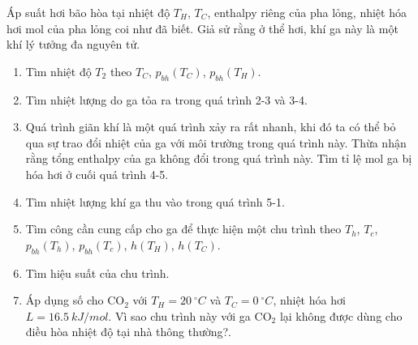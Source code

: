 Áp suất hơi bão hòa tại nhiệt độ \(T_H\), \(T_C\), enthalpy riêng của pha lỏng, nhiệt hóa hơi mol của pha lỏng coi như đã biết. Giả sử rằng ở thể hơi, khí ga này là một khí lý tưởng đa nguyên tử.
\begin{enumerate}
    \item Tìm nhiệt độ \(T_2\) theo \(T_C\), \(p_{bh}(T_C)\), \(p_{bh}(T_H)\).
    \item Tìm nhiệt lượng do ga tỏa ra trong quá trình 2-3 và 3-4.
    \item Quá trình giãn khí là một quá trình xảy ra rất nhanh, khi đó ta có thể bỏ qua sự trao đổi nhiệt của ga với môi trường trong quá trình này. Thừa nhận rằng tổng enthalpy của ga không đổi trong quá trình này. Tìm tỉ lệ mol ga bị hóa hơi ở cuối quá trình 4-5.
    \item Tìm nhiệt lượng khí ga thu vào trong quá trình 5-1.
    \item Tìm công cần cung cấp cho ga để thực hiện một chu trình theo \(T_h\), \(T_c\), \(p_{bh}(T_h)\), \(p_{bh}(T_c)\), \(h(T_H)\), \(h(T_C)\).
    \item Tìm hiệu suất của chu trình.
    \item Áp dụng số cho \(\mathrm{CO}_2\) với \(T_H = \SI{20}{^{\circ} C}\) và \(T_C = \SI{0}{^{\circ} C}\), nhiệt hóa hơi \(L = \SI{16.5}{kJ/mol}\). Vì sao chu trình này với ga \(\mathrm{CO}_2\) lại không được dùng cho điều hòa nhiệt độ tại nhà thông thường?.
\end{enumerate}

    

